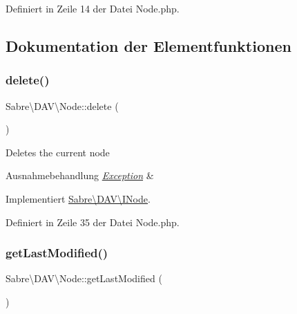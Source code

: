 Definiert in Zeile 14 der Datei Node.\+php.



\subsection{Dokumentation der Elementfunktionen}
\mbox{\label{class_sabre_1_1_d_a_v_1_1_node_aab3dca6fc9d878b38b4af9d097bd09d1}} 
\subsubsection{\texorpdfstring{delete()}{delete()}}
{\footnotesize\ttfamily Sabre\textbackslash{}\+D\+A\+V\textbackslash{}\+Node\+::delete (\begin{DoxyParamCaption}{ }\end{DoxyParamCaption})}

Deletes the current node


\begin{DoxyExceptions}{Ausnahmebehandlung}
{\em \mbox{\hyperlink{class_sabre_1_1_d_a_v_1_1_exception}{Exception}}} & \\
\hline
\end{DoxyExceptions}


Implementiert \mbox{\hyperlink{interface_sabre_1_1_d_a_v_1_1_i_node_a72cd0ee4e36dfced2b0412d14dbd73e6}{Sabre\textbackslash{}\+D\+A\+V\textbackslash{}\+I\+Node}}.



Definiert in Zeile 35 der Datei Node.\+php.

\mbox{\label{class_sabre_1_1_d_a_v_1_1_node_a270cf8a08ed3cf7a0db7db34d3aa2327}} 
\subsubsection{\texorpdfstring{get\+Last\+Modified()}{getLastModified()}}
{\footnotesize\ttfamily Sabre\textbackslash{}\+D\+A\+V\textbackslash{}\+Node\+::get\+Last\+Modified (\begin{DoxyParamCaption}{ }\end{DoxyParamCaption})}


